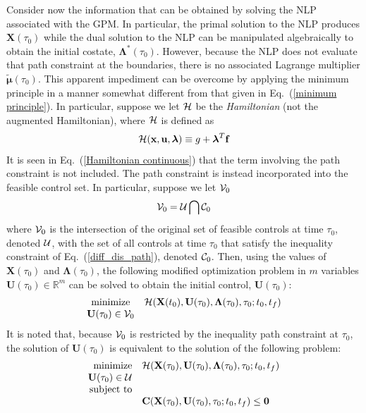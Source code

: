 \documentclass[10pt,final]{report}
\begin{document}
Consider now the information that can be obtained by solving the NLP
associated with the GPM.  In particular, the primal solution to the NLP
produces $\textbf{X}(\tau_0)$ while the dual solution to the NLP can be
manipulated algebraically to obtain the initial costate, $\boldsymbol{\Lambda}^*(\tau_0)$.
However, because the NLP does not evaluate that path constraint at the boundaries, there is no associated Lagrange multiplier $\tilde{\boldsymbol{\mu}}(\tau_0)$.  This apparent impediment can be overcome by
applying the minimum principle in a manner somewhat different from that given
in Eq.~(\ref{minimum principle}).  In particular, suppose we let
${\cal H}$ be the {\em Hamiltonian} (not the augmented Hamiltonian), where
${\cal H}$ is defined as
\begin{equation}\label{Hamiltonian continuous}
  {\cal H}(\textbf{x},\textbf{u},\boldsymbol{\lambda})
  \equiv g + \boldsymbol{\lambda}^T\textbf{f}
\end{equation}
It is seen in Eq.~(\ref{Hamiltonian continuous}) that the term
involving the path constraint is not included.  The path constraint is instead incorporated into the feasible
control set.  In particular, suppose we let
${\cal V}_0$
\begin{equation}
  {\cal V}_0 = {\cal U} \bigcap {\cal C}_0
\end{equation}
where ${\cal V}_0$ is the intersection of the original set of
feasible controls at time $\tau_0$, denoted ${\cal U}$, with the set of all
controls at time $\tau_0$ that satisfy the inequality constraint of Eq.~(\ref{diff_dis_path}), denoted ${\cal C}_0$.
Then, using the values of $\textbf{X}(\tau_0)$ and
$\boldsymbol{\Lambda}(\tau_0)$, the following modified optimization
problem in $m$ variables $\textbf{U}(\tau_0)\in\mathbb{R}^m$ can be
solved to obtain the initial control, $\textbf{U}(\tau_0)$:
\begin{equation}\label{modified minimum principle}
  \begin{array}{cr}
    \displaystyle\textrm{minimize} &  {\cal
    H}(\textbf{X}(t_0),\textbf{U}(\tau_0),\boldsymbol{\Lambda}(\tau_0),\tau_0;t_0,t_f) \\
    {\textbf{U}(\tau_0)\in{\cal V}_0}
  \end{array}
\end{equation}
It is noted that, because ${\cal V}_0$ is restricted by the
inequality path constraint at $\tau_0$, the solution of $\textbf{U}(\tau_0)$ is
equivalent to the solution of the following problem:
\begin{equation}\label{modified minimum principle 2}
  \begin{array}{rl}
    \displaystyle\textrm{minimize} &  {\cal
    H}(\textbf{X}(\tau_0),\textbf{U}(\tau_0),\boldsymbol{\Lambda}(\tau_0),\tau_0;t_0,t_f) \\
    {\textbf{U}(\tau_0)\in{\cal U}} \\
    \textrm{subject to} \\
    & \textbf{C}(\textbf{X}(\tau_0),\textbf{U}(\tau_0),\tau_0;t_0,t_f) \leq \textbf{0}
  \end{array}
\end{equation}
\end{document}
